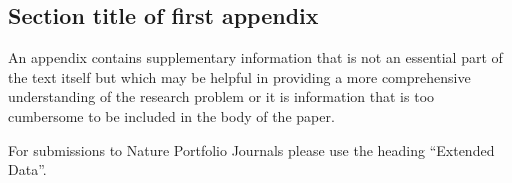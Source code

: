 \documentclass[sn-basic,lineno,pdflatex]{sn-jnl}
\theoremstyle{remark}
\theoremstyle{definition}
\begin{document}
\begin{appendices}

\section{Section title of first appendix}\label{secA1}

An appendix contains supplementary information that is not an essential
part of the text itself but which may be helpful in providing a more
comprehensive understanding of the research problem or it is information
that is too cumbersome to be included in the body of the paper.

For submissions to Nature Portfolio Journals please use the heading
``Extended Data''.

\end{appendices}


\end{document}
